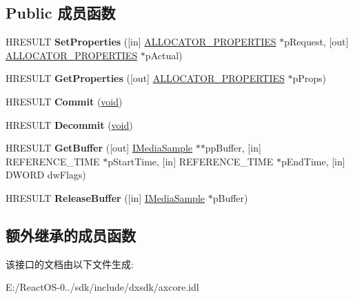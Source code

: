 \subsection*{Public 成员函数}
\begin{DoxyCompactItemize}
\item 
\mbox{\label{interface_i_mem_allocator_a6125234cd712f3801ecba2e97bf8301b}} 
H\+R\+E\+S\+U\+LT {\bfseries Set\+Properties} (\mbox{[}in\mbox{]} \hyperlink{struct___allocator_properties}{A\+L\+L\+O\+C\+A\+T\+O\+R\+\_\+\+P\+R\+O\+P\+E\+R\+T\+I\+ES} $\ast$p\+Request, \mbox{[}out\mbox{]} \hyperlink{struct___allocator_properties}{A\+L\+L\+O\+C\+A\+T\+O\+R\+\_\+\+P\+R\+O\+P\+E\+R\+T\+I\+ES} $\ast$p\+Actual)
\item 
\mbox{\label{interface_i_mem_allocator_a96aa140a5f547ac01800818e33abc79a}} 
H\+R\+E\+S\+U\+LT {\bfseries Get\+Properties} (\mbox{[}out\mbox{]} \hyperlink{struct___allocator_properties}{A\+L\+L\+O\+C\+A\+T\+O\+R\+\_\+\+P\+R\+O\+P\+E\+R\+T\+I\+ES} $\ast$p\+Props)
\item 
\mbox{\label{interface_i_mem_allocator_a7001198c8095b0096218dc2a367e4c18}} 
H\+R\+E\+S\+U\+LT {\bfseries Commit} (\hyperlink{interfacevoid}{void})
\item 
\mbox{\label{interface_i_mem_allocator_ac98c429ecde02fb68c09afebac8bd643}} 
H\+R\+E\+S\+U\+LT {\bfseries Decommit} (\hyperlink{interfacevoid}{void})
\item 
\mbox{\label{interface_i_mem_allocator_a8d097292047a96354804fbff8c8dcc9b}} 
H\+R\+E\+S\+U\+LT {\bfseries Get\+Buffer} (\mbox{[}out\mbox{]} \hyperlink{interface_i_media_sample}{I\+Media\+Sample} $\ast$$\ast$pp\+Buffer, \mbox{[}in\mbox{]} R\+E\+F\+E\+R\+E\+N\+C\+E\+\_\+\+T\+I\+ME $\ast$p\+Start\+Time, \mbox{[}in\mbox{]} R\+E\+F\+E\+R\+E\+N\+C\+E\+\_\+\+T\+I\+ME $\ast$p\+End\+Time, \mbox{[}in\mbox{]} D\+W\+O\+RD dw\+Flags)
\item 
\mbox{\label{interface_i_mem_allocator_a4eb7bcf3ed53f717d892ae94b3bed1ed}} 
H\+R\+E\+S\+U\+LT {\bfseries Release\+Buffer} (\mbox{[}in\mbox{]} \hyperlink{interface_i_media_sample}{I\+Media\+Sample} $\ast$p\+Buffer)
\end{DoxyCompactItemize}
\subsection*{额外继承的成员函数}


该接口的文档由以下文件生成\+:\begin{DoxyCompactItemize}
\item 
E\+:/\+React\+O\+S-\/0../sdk/include/dxsdk/axcore.\+idl\end{DoxyCompactItemize}
